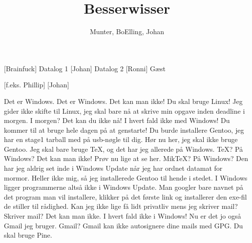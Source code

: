 \documentclass[a4paper,11pt]{article}
\title{Besserwisser}
\author{Munter, BoElling, Johan}
\begin{document}
\maketitle

\begin{roles}
[Brainfuck] Datalog 1
[Johan] Datalog 2
[Ronni] Gæst
\end{roles}

\begin{props}
[f.eks. Phillip]
[Johan]
\end{props}

  
\begin{sketch}

 
 Det er Windows.
 Det er Windows.
 Det kan man ikke!
 Du skal bruge Linux!
 Jeg gider ikke skifte til Linux, jeg skal bare nå at skrive min opgave inden deadline i morgen.
 I morgen?
 Det kan du ikke nå!
 I hvert fald ikke med Windows!
 Du kommer til at bruge hele dagen på at genstarte!
 Du burde installere Gentoo, jeg har en stage1 tarball med på usb-nøgle til dig. 
 Hør nu her, jeg skal ikke bruge Gentoo. Jeg skal bare bruge \TeX{}, og det har jeg allerede på Windows.
 \TeX{}?
 På Windows?
 Det kan man ikke!
 Prøv nu lige at se her. 
 Mik\TeX{}?
 På Windows?
 Den har jeg aldrig set inde i Windows Update når jeg har ordnet datamat for mormor.
 Heller ikke mig, så jeg installerede Gentoo til hende i stedet.
 I Windows ligger programmerne altså ikke i Windows Update. Man googler bare navnet på det program man vil installere, klikker på det første link og installerer den exe-fil de stiller til rådighed. 
 Kan jeg ikke lige få lidt privatliv mens jeg skriver mail?
 Skriver mail?
 Det kan man ikke.
 I hvert fald ikke i Windows!
 Nu er det jo også Gmail jeg bruger.
 Gmail?
 Gmail kan ikke autosignere dine mails med GPG.
 Du skal bruge Pine.

\end{sketch}
\end{document}
